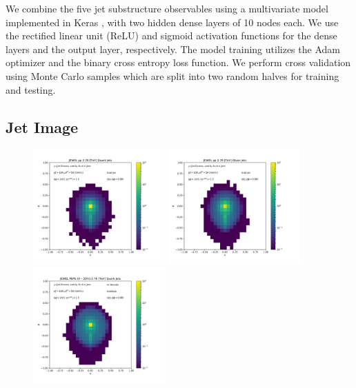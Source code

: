 \documentclass[notoc,preprintnumbers]{JHEP3}
\begin{document}
We combine the five jet substructure observables using a multivariate model implemented in Keras \cite{keras}, with two hidden dense layers of 10 nodes each. We use the rectified linear unit (ReLU) \cite{nair2010rectified} and sigmoid activation functions for the dense layers and the output layer, respectively. The model training utilizes the Adam optimizer \cite{adam} and the binary cross entropy loss function. We perform cross validation using Monte Carlo samples which are split into two random halves for training and testing.

\subsection{Jet Image}
\label{sec:image}

\begin{figure}[t]
\centering
\includegraphics[width=0.45\textwidth]{plots/JEWEL_pp_2p76TeV_AverageQuarkJet_Ypt100_jpt50.pdf}
\includegraphics[width=0.45\textwidth]{plots/JEWEL_pp_2p76TeV_AverageGluonJet_Ypt100_jpt50.pdf}
\includegraphics[width=0.45\textwidth]{plots/JEWEL_pbpb020_2p76TeV_AverageQuarkJet_Ypt100_jpt50.pdf}

\end{figure}
\end{document}
